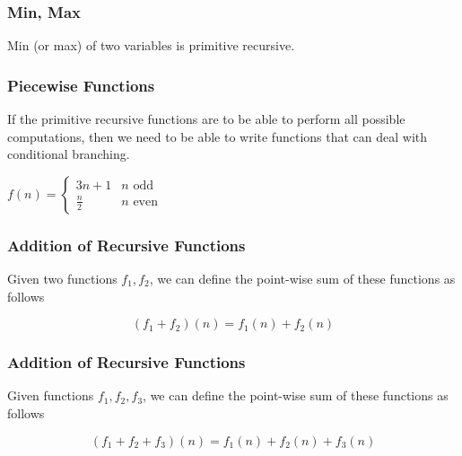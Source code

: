 \documentclass{beamer}
\theoremstyle{indentDefn} \newtheorem{defn}[]{Definition}
\begin{document}
\begin{frame}
	\frametitle{Min, Max}

	Min (or max) of two variables is primitive recursive. 

	\vspace{7cm}



\end{frame}

\begin{frame}
  \frametitle{Piecewise Functions}

	If the primitive recursive functions are to be able to perform all possible computations, then we need to be able to write functions that can deal with conditional branching. 

	\vspace{0.5cm}

			$f(n) = \begin{cases}
				3n+1 & n \text{ odd} \\
				\frac{n}{2} & n \text{ even}
			\end{cases}$

			\hspace{1cm}



	\vspace{5cm}

\end{frame}

\begin{frame}
	\frametitle{Addition of Recursive Functions}

	Given two functions $f_{1},f_{2}$, we can define the point-wise sum of these functions as follows 

	$$(f_{1} + f_{2})(n) = f_{1}(n) + f_{2}(n)$$
	

	\vspace{6cm}

\end{frame}

\begin{frame}
	\frametitle{Addition of Recursive Functions}

	Given functions $f_{1},f_{2},f_{3}$, we can define the point-wise sum of these functions as follows 

	$$(f_{1} + f_{2} + f_{3})(n) = f_{1}(n) + f_{2}(n) + f_{3}(n)$$
	

	\vspace{6cm}

\end{frame}
\end{document}
